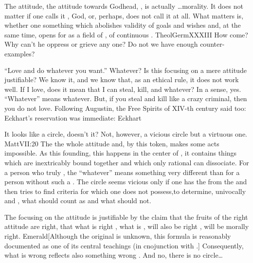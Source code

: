 \pa The  attitude, the attitude towards Godhead, 
, is actually \ldots  morality.  It does not matter if
one calls it , God,  or, perhaps, does not call it
at all.  What matters is, whether one  something 
which abolishes validity of   goals and wishes and,
at the same time, opens for   as a field of
, of continuous .
\citet{Neither may a man who is made a partaker of the divine nature, 
oppress or grieve any one. That is, it never entereth into his 
thoughts, or intents, or wishes, to cause pain or distress to any, 
either by deed or neglect, by speach or silence.}{TheolGerm}{XXXIII}
How come? Why can't he oppress or grieve any one? Do not we have 
enough counter-examples?

\pa ``Love and do whatever you want.'' Whatever? Is this focusing
on a mere attitude justifiable? We know it, and we know that, as an
ethical rule, it does not work well. If I love, does it mean that I
can steal, kill, and whatever?  In a sense, yes.  ``Whatever'' means
whatever.  But, if you steal and kill like a crazy criminal, then you
do not love.  Following Augustin, the Free Spirits of XIV-th century
said too:  Eckhart's reservation was
immediate: \citet{Yes; but as long as you like anything contrary to
God's will, you do not love Him.}{Eckhart}{}

It looks like a circle, doesn't it?  Not, however, a
vicious circle but a virtuous one.  \citet{[B]y their fruits ye shall
know them}{Matt}{VII:20} The   the whole
attitude and, by this token, makes some acts impossible.  As this
founding, this  happens in the  center
of , it contains things which are inextricably bound
together and which only rational  can dissociate.  For
a person who truly , the ``whatever'' means something very
different than for a person without such a .  The circle seems
vicious only if one has  the  from the 
 and then tries to find  criteria for  which
one does not possess,to determine, univocally and
, what should count as  and what should not.

\pa
The focusing on the attitude is justifiable by the claim that the 
fruits of the right attitude are right, that what is right 
, what is ,  
will also be right , will be morally right. \citet{As above, 
so below}{Emerald}{[Although the 
original is unknown, this formula is reasonably documented as one of 
its central teachings (in cnojunction with .]}
Consequently, what is wrong 
 reflects also something wrong . 
And no, there is no circle\ldots

